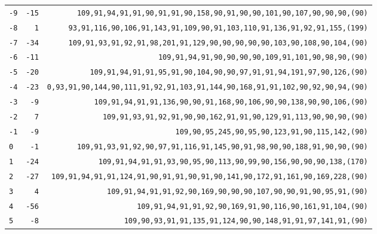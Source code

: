\begin{table}[!phtb]
\begin{tabular}{@{\hskip 0.31cm}L@{\hskip 0.27cm}r@{\hskip 0.27cm}R@{\hskip 0.34cm}}
		\texttt{-9} & \texttt{-15} & \footnotesize\texttt{109,91,94,91,91,90,91,91,90,158,90,91,90,90,101,90,107,90,90,90,{\color{gray}(90)}} \\
		\texttt{-8} & \texttt{1} & \footnotesize\texttt{93,91,116,90,106,91,143,91,109,90,91,103,110,91,136,91,92,91,155,{\color{gray}(199)}} \\
		\texttt{-7} & \texttt{-34} & \footnotesize\texttt{109,91,93,91,92,91,98,201,91,129,90,90,90,90,90,103,90,108,90,104,{\color{gray}(90)}} \\
		\texttt{-6} & \texttt{-11} & \footnotesize\texttt{109,91,94,91,90,90,90,90,109,91,101,90,98,90,{\color{gray}(90)}} \\
		\texttt{-5} & \texttt{-20} & \footnotesize\texttt{109,91,94,91,91,95,91,90,104,90,90,97,91,91,94,191,97,90,126,{\color{gray}(90)}} \\
		\texttt{-4} & \texttt{-23} & \footnotesize\texttt{0,93,91,90,144,90,111,91,92,91,103,91,144,90,168,91,91,102,90,92,90,94,{\color{gray}(90)}} \\
		\texttt{-3} & \texttt{-9} & \footnotesize\texttt{109,91,94,91,91,136,90,90,91,168,90,106,90,90,138,90,90,106,{\color{gray}(90)}} \\
		\texttt{-2} & \texttt{7} & \footnotesize\texttt{109,91,93,91,92,91,90,90,162,91,91,90,129,91,113,90,90,90,{\color{gray}(90)}} \\
		\texttt{-1} & \texttt{-9} & \footnotesize\texttt{109,90,95,245,90,95,90,123,91,90,115,142,{\color{gray}(90)}} \\\midrule
		\texttt{0} & \texttt{-1} & \scriptsize\texttt{109,91,93,91,92,90,97,91,116,91,145,90,91,98,90,90,188,91,90,90,{\color{gray}(90)}} \\\midrule
		\texttt{1} & \texttt{-24} & \scriptsize\texttt{109,91,94,91,91,93,90,95,90,113,90,99,90,156,90,90,90,138,{\color{gray}(170)}} \\
		\texttt{2} & \texttt{-27} & \scriptsize\texttt{109,91,94,91,91,124,91,90,91,91,90,91,90,141,90,172,91,161,90,169,228,{\color{gray}(90)}} \\
		\texttt{3} & \texttt{4} & \scriptsize\texttt{109,91,94,91,91,92,90,169,90,90,90,107,90,90,91,90,95,91,{\color{gray}(90)}} \\
		\texttt{4} & \texttt{-56} & \scriptsize\texttt{109,91,94,91,91,92,90,169,91,90,116,90,161,91,104,{\color{gray}(90)}} \\
		\texttt{5} & \texttt{-8} & \footnotesize\texttt{109,90,93,91,91,135,91,124,90,90,148,91,91,97,141,91,{\color{gray}(90)}} \\

\end{tabular}
\end{table}
